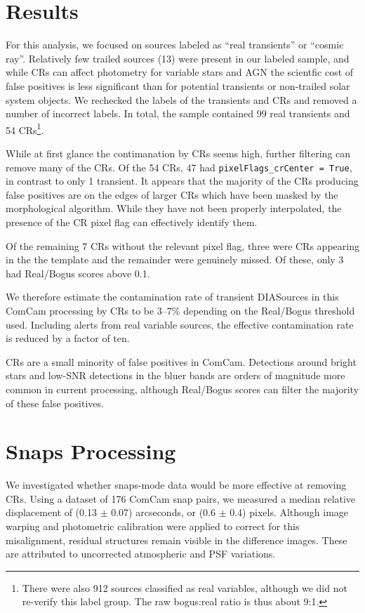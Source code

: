 \documentclass[DM,lsstdraft,authoryear,toc]{lsstdoc}
\begin{document}
\section{Results} \label{sec:results}

For this analysis, we focused on sources labeled as ``real transients'' or ``cosmic ray''.
Relatively few trailed sources (13) were present in our labeled sample, and while CRs can affect photometry for variable stars and AGN the scientfic cost of false positives is less significant than for potential transients or non-trailed solar system objects.
We rechecked the labels of the transients and CRs and removed a number of incorrect labels.
In total, the sample contained 99 real transients and 54 CRs\footnote{There were also 912 sources classified as real variables, although we did not re-verify this label group.  
The raw bogus:real ratio is thus about 9:1.}.

While at first glance the contimanation by CRs seems high, further filtering can remove many of the CRs.
Of the 54 CRs, 47 had \texttt{pixelFlags_crCenter = True}, in contrast to only 1 transient.
It appears that the majority of the CRs producing false positives are on the edges of larger CRs which have been masked by the morphological algorithm.
While they have not been properly interpolated, the presence of the CR pixel flag can effectively identify them.

Of the remaining 7 CRs without the relevant pixel flag, three were CRs appearing in the the template and the remainder were genuinely missed.
Of these, only 3 had Real/Bogus scores above 0.1.

We therefore estimate the contamination rate of transient DIASources in this ComCam processing by CRs to be 3--7\% depending on the Real/Bogus threshold used.
Including alerts from real variable sources, the effective contamination rate is reduced by a factor of ten.

CRs are a small minority of false positives in ComCam.
Detections around bright stars and low-SNR detections in the bluer bands are orders of magnitude more common in current processing, although Real/Bogus scores can filter the majority of these false positives.

\section{Snaps Processing}

We investigated whether snaps-mode data would be more effective at removing CRs.
Using a dataset of 176 ComCam snap pairs, we measured a median relative displacement of (0.13 $\pm$ 0.07) arcseconds, or (0.6 $\pm$ 0.4) pixels. 
Although image warping and photometric calibration were applied to correct
for this misalignment, residual structures remain visible in the difference images.  
These are attributed to uncorrected atmospheric and PSF variations.
\end{document}
